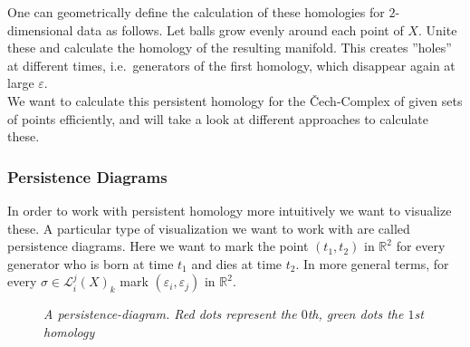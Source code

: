 \documentclass[11pt, a4paper, UKenglish]{article}
\newcommand{\bR}{\mathbb{R}}
\begin{document}
    One can geometrically define the calculation of these homologies for $2$-dimensional data as follows.
    Let balls grow evenly around each point of $X$.
    Unite these and calculate the homology of the resulting manifold.
    This creates ''holes'' at different times, i.e.\ generators of the first homology, which disappear again at large $\varepsilon$.\\
    We want to calculate this persistent homology for the Čech-Complex of given sets of points efficiently, and will take a look at different approaches to calculate these.
    \subsubsection{Persistence Diagrams}\label{subsec:persistence-diagrams}

    In order to work with persistent homology more intuitively we want to visualize these.
    A particular type of visualization we want to work with are called persistence diagrams.
    Here we want to mark the point $(t_1,t_2)$ in $\bR^2$ for every generator who is born at time $t_1$ and dies at time $t_2$.
    In more general terms, for every $\sigma\in\mathcal{L}_i^j(X)_k$ mark $(\varepsilon_i,\varepsilon_j)$ in $\bR^2$.
    \begin{figure}
        \centering
        \caption{\textit{A persistence-diagram.
        Red dots represent the $0$th, green dots the $1$st homology}}
        \label{fig2}
    \end{figure}
\end{document}

